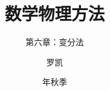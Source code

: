 \documentclass[fontset=fandol,10pt]{ctexbeamer}
\title{数学物理方法}
\subtitle{第六章：变分法}
\author{罗凯}
\institute{南京理工大学物理学院}
\date{\zhdigits{2026}年秋季}
\begin{document}
\chaptertitleframe
\chapteroutline

\end{document}
